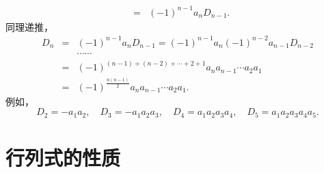 \documentclass[10pt,a4paper%
tablecaptionabove]{article}
\begin{document}
\begin{CJK}{UTF8}{gkai}
\begin{jie}
$$\begin{array}{rcl}
          &=&  (-1)^{n-1} a_n D_{n-1}.      
    \end{array}
    $$
    同理递推，
    $$
    \begin{array}{rcl}
      D_n & =& (-1)^{n-1} a_n D_{n-1}  = (-1)^{n-1} a_n (-1)^{n-2} a_{n-1} D_{n-2} \\[0.1in]
          && \cdots\cdots \\[0.2cm]
          &=&   (-1)^{(n-1)+(n-2)+\cdots+2+1} a_n a_{n-1} \cdots a_2 a_1 \\[0.1in]
          &=&  (-1)^{\frac{n(n-1)}{2}} a_n a_{n-1} \cdots a_2 a_1.
    \end{array}
    $$
    例如，
    $$
    D_2 = -a_1a_2, \quad
    D_3 = -a_1a_2a_3, \quad
    D_4 = a_1a_2a_3a_4, \quad
    D_5 = a_1a_2a_3a_4a_5.
    $$
  \end{jie}



  \section{行列式的性质}


\end{CJK}
\end{document}

